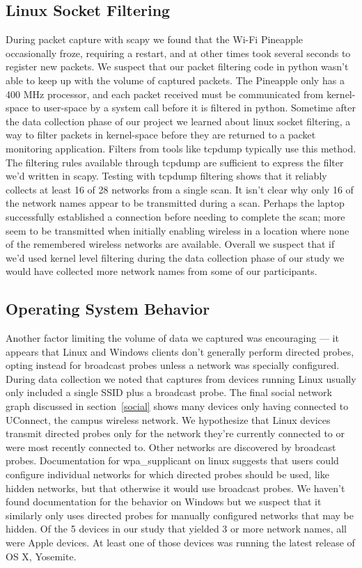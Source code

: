 \documentclass[letterpaper,twocolumn,10pt]{article}
\begin{document}
\subsection{Linux Socket Filtering}
\label{bpf}
During packet capture with scapy we found that the Wi-Fi Pineapple occasionally froze, requiring a restart, and at other times took several seconds to register new packets. We suspect that our packet filtering code in python wasn't able to keep up with the volume of captured packets. The Pineapple only has a 400 MHz processor, and each packet received must be communicated from kernel-space to user-space by a system call before it is filtered in python. Sometime after the data collection phase of our project we learned about linux socket filtering, a way to filter packets in kernel-space before they are returned to a packet monitoring application. Filters from tools like tcpdump typically use this method. The filtering rules available through tcpdump are sufficient to express the filter we'd written in scapy. Testing with tcpdump filtering shows that it reliably collects at least 16 of 28 networks from a single scan. It isn't clear why only 16 of the network names appear to be transmitted during a scan. Perhaps the laptop successfully established a connection before needing to complete the scan; more seem to be transmitted when initially enabling wireless in a location where none of the remembered wireless networks are available. Overall we suspect that if we'd used kernel level filtering during the data collection phase of our study we would have collected more network names from some of our participants.

\subsection{Operating System Behavior}
Another factor limiting the volume of data we captured was encouraging --- it appears that Linux and Windows clients don't generally perform directed probes, opting instead for broadcast probes unless a network was specially configured. During data collection we noted that captures from devices running Linux usually only included a single SSID plus a broadcast probe. The final social network graph discussed in section~\ref{social} shows many devices only having connected to UConnect, the campus wireless network. We hypothesize that Linux devices transmit directed probes only for the network they're currently connected to or were most recently connected to. Other networks are discovered by broadcast probes. Documentation for wpa\_supplicant on linux suggests that users could configure individual networks for which directed probes should be used, like hidden networks, but that otherwise it would use broadcast probes. We haven't found documentation for the behavior on Windows but we suspect that it similarly only uses directed probes for manually configured networks that may be hidden. Of the 5 devices in our study that yielded 3 or more network names, all were Apple devices. At least one of those devices was running the latest release of OS X, Yosemite.
\end{document}
